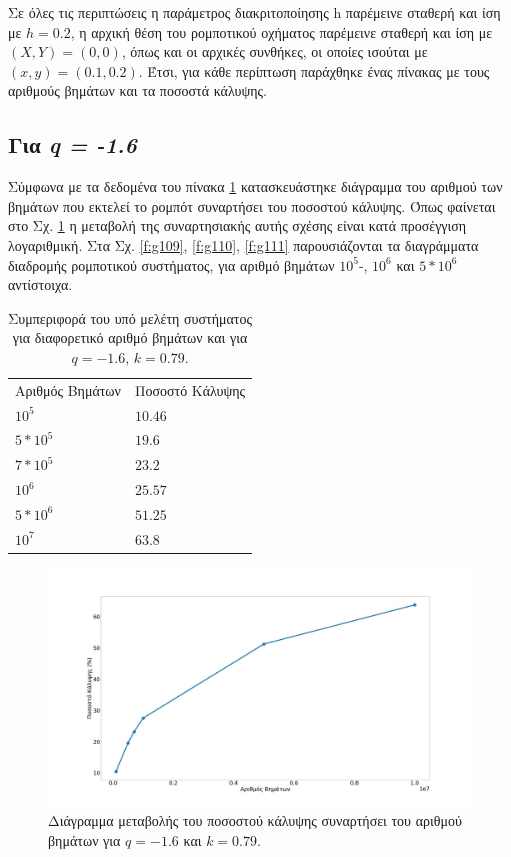 Σε όλες τις περιπτώσεις η παράμετρος διακριτοποίησης h παρέμεινε σταθερή και ίση με $h = 0.2$, η αρχική θέση του ρομποτικού οχήματος παρέμεινε σταθερή και ίση με $(X,Y) = (0,0)$, όπως και οι αρχικές συνθήκες, οι οποίες ισούται με $(x,y) = (0.1,0.2)$. Έτσι, για κάθε περίπτωση παράχθηκε ένας πίνακας με τους αριθμούς βημάτων και τα ποσοστά κάλυψης.

\subsection{Για \emph{q = -1.6}}

Σύμφωνα με τα δεδομένα του πίνακα \ref{tab:abc14} κατασκευάστηκε διάγραμμα του αριθμού των βημάτων που εκτελεί το ρομπότ συναρτήσει του ποσοστού κάλυψης. Όπως φαίνεται στο Σχ. \ref{f:g108} η μεταβολή της συναρτησιακής αυτής σχέσης είναι κατά προσέγγιση λογαριθμική. Στα Σχ. \ref{f:g109}, \ref{f:g110}, \ref{f:g111} παρουσιάζονται τα διαγράμματα διαδρομής ρομποτικού συστήματος, για αριθμό βημάτων $10^5$-, $10^6$ και $5*10 ^6$ αντίστοιχα.

\begin{table}[ht]
	\centering
	\caption{Συμπεριφορά του υπό μελέτη συστήματος για διαφορετικό αριθμό βημάτων και για $q = -1.6$, $k = 0.79$.}
	\begin{tabular}{l | l }
		Αριθμός Βημάτων & Ποσοστό Κάλυψης \\
		
		$10^5$ &  $10.46$ \\
		$5*10^5$ & $19.6$ \\
		$7*10^5$&  $23.2$ \\
		$10^6$ & $25.57$ \\
		$5*10^6$& $51.25$\\
		$10^7$& $63.8$ \\
		
	\end{tabular}	
	\label{tab:abc14}
\end{table}




\begin{figure}[ht]
	\centering
	\includegraphics[width=1\linewidth]{LateX images/log/steps/g1}
	\caption{Διάγραμμα μεταβολής του ποσοστού κάλυψης συναρτήσει του αριθμού βημάτων για $q = -1.6$ και $k= 0.79$.}
	\label{f:g108}	
\end{figure}


